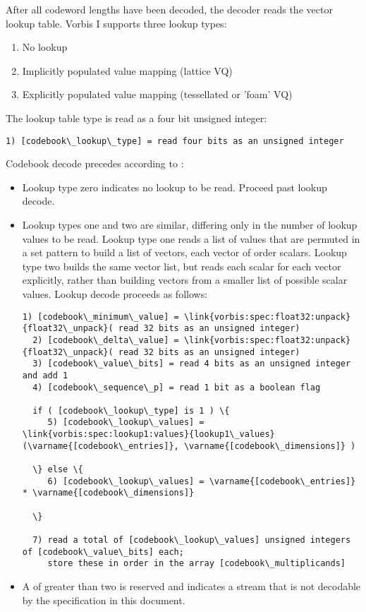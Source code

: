 After all codeword lengths have been decoded, the decoder reads the
vector lookup table.  Vorbis I supports three lookup types:
\begin{enumerate}
\item
No lookup
\item
Implicitly populated value mapping (lattice VQ)
\item
Explicitly populated value mapping (tessellated or 'foam'
VQ)
\end{enumerate}


The lookup table type is read as a four bit unsigned integer:
\begin{Verbatim}[commandchars=\\\{\}]
  1) [codebook\_lookup\_type] = read four bits as an unsigned integer
\end{Verbatim}

Codebook decode precedes according to :
\begin{itemize}
\item
Lookup type zero indicates no lookup to be read.  Proceed past
lookup decode.
\item
Lookup types one and two are similar, differing only in the
number of lookup values to be read.  Lookup type one reads a list of
values that are permuted in a set pattern to build a list of vectors,
each vector of order  scalars.  Lookup
type two builds the same vector list, but reads each scalar for each
vector explicitly, rather than building vectors from a smaller list of
possible scalar values.  Lookup decode proceeds as follows:

\begin{Verbatim}[commandchars=\\\{\}]
  1) [codebook\_minimum\_value] = \link{vorbis:spec:float32:unpack}{float32\_unpack}( read 32 bits as an unsigned integer)
  2) [codebook\_delta\_value] = \link{vorbis:spec:float32:unpack}{float32\_unpack}( read 32 bits as an unsigned integer)
  3) [codebook\_value\_bits] = read 4 bits as an unsigned integer and add 1
  4) [codebook\_sequence\_p] = read 1 bit as a boolean flag

  if ( [codebook\_lookup\_type] is 1 ) \{
     5) [codebook\_lookup\_values] = \link{vorbis:spec:lookup1:values}{lookup1\_values}(\varname{[codebook\_entries]}, \varname{[codebook\_dimensions]} )

  \} else \{
     6) [codebook\_lookup\_values] = \varname{[codebook\_entries]} * \varname{[codebook\_dimensions]}

  \}

  7) read a total of [codebook\_lookup\_values] unsigned integers of [codebook\_value\_bits] each;
     store these in order in the array [codebook\_multiplicands]
\end{Verbatim}
\item
A  of greater than two is reserved
and indicates a stream that is not decodable by the specification in this
document.

\end{itemize}


